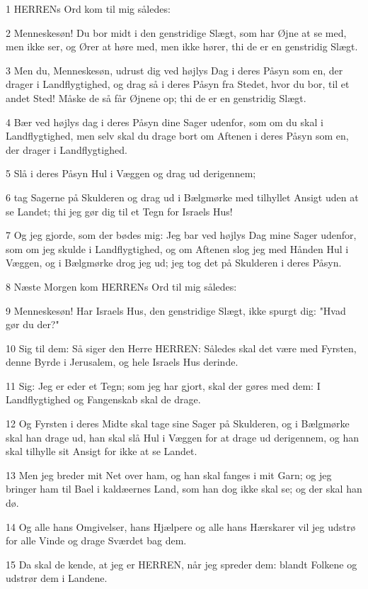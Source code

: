 \par 1 HERRENs Ord kom til mig således:
\par 2 Menneskesøn! Du bor midt i den genstridige Slægt, som har Øjne at se med, men ikke ser, og Ører at høre med, men ikke hører, thi de er en genstridig Slægt.
\par 3 Men du, Menneskesøn, udrust dig ved højlys Dag i deres Påsyn som en, der drager i Landflygtighed, og drag så i deres Påsyn fra Stedet, hvor du bor, til et andet Sted! Måske de så får Øjnene op; thi de er en genstridig Slægt.
\par 4 Bær ved højlys dag i deres Påsyn dine Sager udenfor, som om du skal i Landflygtighed, men selv skal du drage bort om Aftenen i deres Påsyn som en, der drager i Landflygtighed.
\par 5 Slå i deres Påsyn Hul i Væggen og drag ud derigennem;
\par 6 tag Sagerne på Skulderen og drag ud i Bælgmørke med tilhyllet Ansigt uden at se Landet; thi jeg gør dig til et Tegn for Israels Hus!
\par 7 Og jeg gjorde, som der bødes mig: Jeg bar ved højlys Dag mine Sager udenfor, som om jeg skulde i Landflygtighed, og om Aftenen slog jeg med Hånden Hul i Væggen, og i Bælgmørke drog jeg ud; jeg tog det på Skulderen i deres Påsyn.
\par 8 Næste Morgen kom HERRENs Ord til mig således:
\par 9 Menneskesøn! Har Israels Hus, den genstridige Slægt, ikke spurgt dig: "Hvad gør du der?"
\par 10 Sig til dem: Så siger den Herre HERREN: Således skal det være med Fyrsten, denne Byrde i Jerusalem, og hele Israels Hus derinde.
\par 11 Sig: Jeg er eder et Tegn; som jeg har gjort, skal der gøres med dem: I Landflygtighed og Fangenskab skal de drage.
\par 12 Og Fyrsten i deres Midte skal tage sine Sager på Skulderen, og i Bælgmørke skal han drage ud, han skal slå Hul i Væggen for at drage ud derigennem, og han skal tilhylle sit Ansigt for ikke at se Landet.
\par 13 Men jeg breder mit Net over ham, og han skal fanges i mit Garn; og jeg bringer ham til Bael i kaldæernes Land, som han dog ikke skal se; og der skal han dø.
\par 14 Og alle hans Omgivelser, hans Hjælpere og alle hans Hærskarer vil jeg udstrø for alle Vinde og drage Sværdet bag dem.
\par 15 Da skal de kende, at jeg er HERREN, når jeg spreder dem: blandt Folkene og udstrør dem i Landene.
